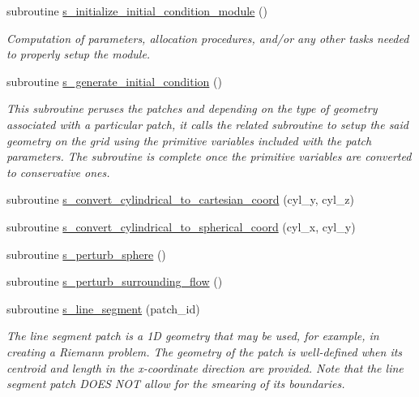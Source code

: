 \begin{DoxyCompactItemize}
subroutine \hyperlink{namespacem__initial__condition_a07a665ff41297455ac2da7b54243bac5}{s\+\_\+initialize\+\_\+initial\+\_\+condition\+\_\+module} ()
\begin{DoxyCompactList}\small\item\em Computation of parameters, allocation procedures, and/or any other tasks needed to properly setup the module. \end{DoxyCompactList}\item 
subroutine \hyperlink{namespacem__initial__condition_aa74a70029e3ec0fd3225b369e7c5443e}{s\+\_\+generate\+\_\+initial\+\_\+condition} ()
\begin{DoxyCompactList}\small\item\em This subroutine peruses the patches and depending on the type of geometry associated with a particular patch, it calls the related subroutine to setup the said geometry on the grid using the primitive variables included with the patch parameters. The subroutine is complete once the primitive variables are converted to conservative ones. \end{DoxyCompactList}\item 
subroutine \hyperlink{namespacem__initial__condition_a791e5fa466dd15343882711c91bae63d}{s\+\_\+convert\+\_\+cylindrical\+\_\+to\+\_\+cartesian\+\_\+coord} (cyl\+\_\+y, cyl\+\_\+z)
\item 
subroutine \hyperlink{namespacem__initial__condition_a88d2e8debdc097d4d811fb67d6fbc880}{s\+\_\+convert\+\_\+cylindrical\+\_\+to\+\_\+spherical\+\_\+coord} (cyl\+\_\+x, cyl\+\_\+y)
\item 
subroutine \hyperlink{namespacem__initial__condition_afef3f507e182798fcfd7aecc52878fc9}{s\+\_\+perturb\+\_\+sphere} ()
\item 
subroutine \hyperlink{namespacem__initial__condition_ab66e3b04024a8ae7327857b1b265bc27}{s\+\_\+perturb\+\_\+surrounding\+\_\+flow} ()
\item 
subroutine \hyperlink{namespacem__initial__condition_a3be32c8ee8a7dffae734d063200471e8}{s\+\_\+line\+\_\+segment} (patch\+\_\+id)
\begin{DoxyCompactList}\small\item\em The line segment patch is a 1D geometry that may be used, for example, in creating a Riemann problem. The geometry of the patch is well-\/defined when its centroid and length in the x-\/coordinate direction are provided. Note that the line segment patch D\+O\+ES N\+OT allow for the smearing of its boundaries. \end{DoxyCompactList}\item 

\end{DoxyCompactItemize}

